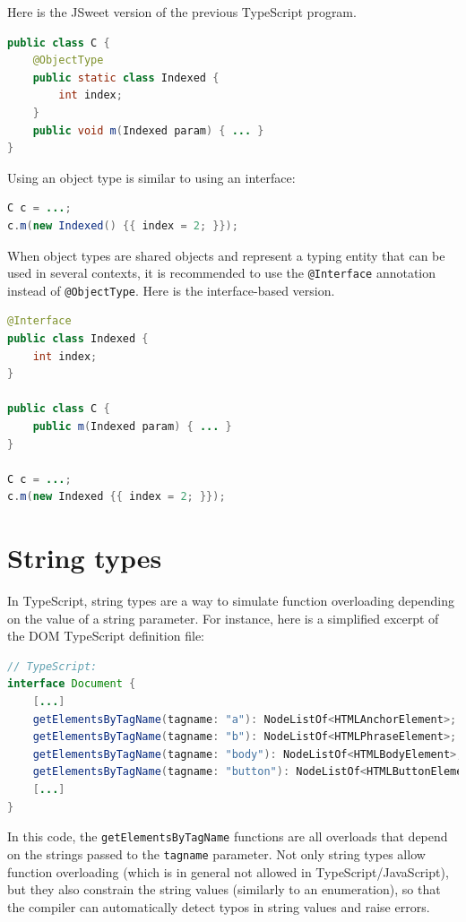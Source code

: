 \documentclass[a4paper]{report}
\begin{document}
Here is the JSweet version of the previous TypeScript program.

\begin{lstlisting}[language=Java]
public class C {
	@ObjectType
	public static class Indexed {
		int index;
	}
	public void m(Indexed param) { ... }
}
\end{lstlisting}

Using an object type is similar to using an interface:

\begin{lstlisting}[language=Java]
C c = ...;
c.m(new Indexed() {{ index = 2; }});
\end{lstlisting}

When object types are shared objects and represent a typing entity that can be used in several contexts, it is recommended to use the \texttt{@Interface} annotation instead of \texttt{@ObjectType}. Here is the interface-based version.

\begin{lstlisting}[language=Java]
@Interface
public class Indexed {
	int index;
}

public class C {
	public m(Indexed param) { ... }
}

C c = ...;
c.m(new Indexed {{ index = 2; }});
\end{lstlisting}

\section{String types}

In TypeScript, string types are a way to simulate function overloading depending on the value of a string parameter. For instance, here is a simplified excerpt of the DOM TypeScript definition file:

\begin{lstlisting}[language=Java]
// TypeScript:
interface Document {
	[...]
	getElementsByTagName(tagname: "a"): NodeListOf<HTMLAnchorElement>;
	getElementsByTagName(tagname: "b"): NodeListOf<HTMLPhraseElement>;
	getElementsByTagName(tagname: "body"): NodeListOf<HTMLBodyElement>;
	getElementsByTagName(tagname: "button"): NodeListOf<HTMLButtonElement>;
	[...]
}
\end{lstlisting}

In this code, the \texttt{getElementsByTagName} functions are all overloads that depend on the strings passed to the \texttt{tagname} parameter. Not only string types allow function overloading (which is in general not allowed in TypeScript/JavaScript), but they also constrain the string values (similarly to an enumeration), so that the compiler can automatically detect typos in string values and raise errors. 
\end{document}
